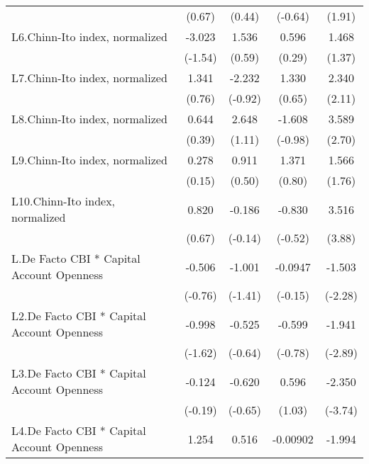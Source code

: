 {\begin{longtable}{l*{4}{c}}
                &   (0.67)         &   (0.44)         &  (-0.64)         &   (1.91)         \\
[1em]
L6.Chinn-Ito index, normalized&   -3.023         &    1.536         &    0.596         &    1.468         \\
                &  (-1.54)         &   (0.59)         &   (0.29)         &   (1.37)         \\
[1em]
L7.Chinn-Ito index, normalized&    1.341         &   -2.232         &    1.330         &    2.340\sym{*}  \\
                &   (0.76)         &  (-0.92)         &   (0.65)         &   (2.11)         \\
[1em]
L8.Chinn-Ito index, normalized&    0.644         &    2.648         &   -1.608         &    3.589\sym{**} \\
                &   (0.39)         &   (1.11)         &  (-0.98)         &   (2.70)         \\
[1em]
L9.Chinn-Ito index, normalized&    0.278         &    0.911         &    1.371         &    1.566         \\
                &   (0.15)         &   (0.50)         &   (0.80)         &   (1.76)         \\
[1em]
L10.Chinn-Ito index, normalized&    0.820         &   -0.186         &   -0.830         &    3.516\sym{***}\\
                &   (0.67)         &  (-0.14)         &  (-0.52)         &   (3.88)         \\
[1em]
L.De Facto CBI * Capital Account Openness&   -0.506         &   -1.001         &  -0.0947         &   -1.503\sym{*}  \\
                &  (-0.76)         &  (-1.41)         &  (-0.15)         &  (-2.28)         \\
[1em]
L2.De Facto CBI * Capital Account Openness&   -0.998         &   -0.525         &   -0.599         &   -1.941\sym{**} \\
                &  (-1.62)         &  (-0.64)         &  (-0.78)         &  (-2.89)         \\
[1em]
L3.De Facto CBI * Capital Account Openness&   -0.124         &   -0.620         &    0.596         &   -2.350\sym{***}\\
                &  (-0.19)         &  (-0.65)         &   (1.03)         &  (-3.74)         \\
[1em]
L4.De Facto CBI * Capital Account Openness&    1.254\sym{*}  &    0.516         & -0.00902         &   -1.994\sym{**} \\

\end{longtable}}

